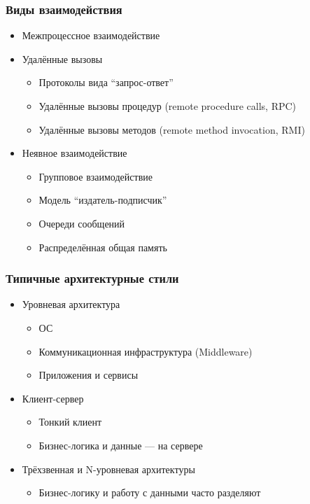 \documentclass[xetex,mathserif,serif]{beamer}
\begin{document}
	\begin{frame}
		\frametitle{Виды взаимодействия}
		\begin{itemize}
			\item Межпроцессное взаимодействие
			\item Удалённые вызовы
			\begin{itemize}
				\item Протоколы вида ``запрос-ответ''
				\item Удалённые вызовы процедур (remote procedure calls, RPC)
				\item Удалённые вызовы методов (remote method invocation, RMI)
			\end{itemize}
			\item Неявное взаимодействие
			\begin{itemize}
				\item Групповое взаимодействие
				\item Модель ``издатель-подписчик''
				\item Очереди сообщений
				\item Распределённая общая память
			\end{itemize}
		\end{itemize}
	\end{frame}

	\begin{frame}
		\frametitle{Типичные архитектурные стили}
		\begin{itemize}
			\item Уровневая архитектура
			\begin{itemize}
				\item ОС
				\item Коммуникационная инфраструктура (Middleware)
				\item Приложения и сервисы
			\end{itemize}
			\item Клиент-сервер
			\begin{itemize}
				\item Тонкий клиент
				\item Бизнес-логика и данные --- на сервере
			\end{itemize}
			\item Трёхзвенная и N-уровневая архитектуры
			\begin{itemize}
				\item Бизнес-логику и работу с данными часто разделяют
			\end{itemize}
		\end{itemize}
	\end{frame}
\end{document}
